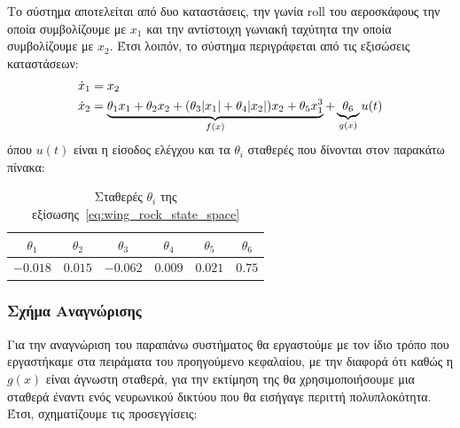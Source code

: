 Το σύστημα αποτελείται από δυο καταστάσεις, την γωνία roll του αεροσκάφους την οποία συμβολίζουμε με $x_1$ και την αντίστοιχη γωνιακή ταχύτητα την οποία συμβολίζουμε με $x_2$. Έτσι λοιπόν, το σύστημα περιγράφεται από τις εξισώσεις καταστάσεων:
\begin{equation}
\begin{split}
\dot{x}_1 &= x_2 \\
\dot{x}_2 &= 
\underbrace{\theta_1 x_1 + \theta_2 x_2 + (\theta_3 \abs{x_1} 
	+ \theta_4 \abs{x_2})x_2 + \theta_5 x_1^3}_{f(x)} 
+ \underbrace{\theta_6}_{g(x)} u(t)
\end{split}
\label{eq:wing_rock_state_space}
\end{equation}
όπου $u(t)$ είναι η είσοδος ελέγχου και τα $\theta_i$ σταθερές που δίνονται στον παρακάτω πίνακα:
\begin{table}[h]
	\begin{center}
		\begin{tabular}{ c | c | c | c | c | c}
			\hline
			\hline
			$\theta_1$ & $\theta_2$  & $\theta_3$ & $\theta_4$  & $\theta_5$ & $\theta_6$  \\   \hline 
			$-0.018$ & $0.015$  & $-0.062$ & $0.009$ & $0.021$ & $0.75$   \\
			\hline
			\hline
		\end{tabular}
		\caption{Σταθερές $\theta_i$ της εξίσωσης~\eqref{eq:wing_rock_state_space}}
		\label{tab:wing_rock_params}
	\end{center}
\end{table}


	
	\subsubsection{Σχήμα Αναγνώρισης}
	Για την αναγνώριση του παραπάνω συστήματος θα εργαστούμε με τον ίδιο τρόπο που εργαστήκαμε στα πειράματα του προηγούμενο κεφαλαίου, με την διαφορά ότι καθώς η $g(x)$ είναι άγνωστη σταθερά, για την εκτίμηση της θα χρησιμοποιήσουμε μια σταθερά έναντι ενός νευρωνικού δικτύου που θα εισήγαγε περιττή πολυπλοκότητα. Έτσι, σχηματίζουμε τις προσεγγίσεις:
	
